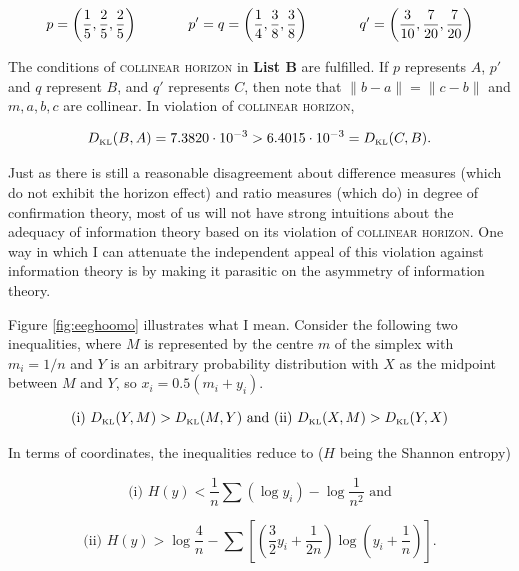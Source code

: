 \documentclass[smallextended]{svjour3}       %
\begin{document}
\begin{equation}
  \label{eq:ubiesohx}
    p=\left(\frac{1}{5},\frac{2}{5},\frac{2}{5}\right) \hspace{.5in}
    p'=q=\left(\frac{1}{4},\frac{3}{8},\frac{3}{8}\right)  \hspace{.5in}
    q'=\left(\frac{3}{10},\frac{7}{20},\frac{7}{20}\right)
\end{equation}

The conditions of \textsc{collinear horizon} in \textbf{List B} are
fulfilled. If $p$ represents $A$, $p'$ and $q$ represent $B$, and $q'$
represents $C$, then note that $\|b-a\|=\|c-b\|$ and $m,a,b,c$ are
collinear. In violation of \textsc{collinear horizon},

\begin{equation}
  \label{eq:eiloothu}
  D_{\mbox{\tiny KL}}(B,A)=7.3820\cdot{}10^{-3}>6.4015\cdot{}10^{-3}=D_{\mbox{\tiny KL}}(C,B).
\end{equation}

Just as there is still a reasonable disagreement about difference
measures (which do not exhibit the horizon effect) and ratio measures
(which do) in degree of confirmation theory, most of us will not have
strong intuitions about the adequacy of information theory based on
its violation of \textsc{collinear horizon}. One way in which I can
attenuate the independent appeal of this violation against information
theory is by making it parasitic on the asymmetry of information
theory.

Figure \ref{fig:eeghoomo} illustrates what I mean. Consider the
following two inequalities, where $M$ is represented by the centre
$m$ of the simplex with $m_{i}=1/n$ and $Y$ is an arbitrary
probability distribution with $X$ as the midpoint between $M$ and $Y$,
so $x_{i}=0.5(m_{i}+y_{i})$.

\begin{equation}
  \label{eq:dailoosu}
  \mbox{(i) }D_{\mbox{\tiny KL}}(Y,M)>D_{\mbox{\tiny KL}}(M,Y)\mbox{ and (ii) }D_{\mbox{\tiny KL}}(X,M)>D_{\mbox{\tiny KL}}(Y,X)
\end{equation}

In terms of coordinates, the inequalities reduce to ($H$ being the
Shannon entropy)

\begin{equation}
  \label{eq:iengaech}
\mbox{(i) }H(y)<\frac{1}{n}\sum\left(\log{}y_{i}\right)-\log\frac{1}{n^{2}}\mbox{ and}
\end{equation}

\begin{equation}
  \label{eq:feovaivo}
\mbox{(ii) }H(y)>\log\frac{4}{n}-\sum\left[\left(\frac{3}{2}y_{i}+\frac{1}{2n}\right)\log\left(y_{i}+\frac{1}{n}\right)\right].
\end{equation}
\end{document}
